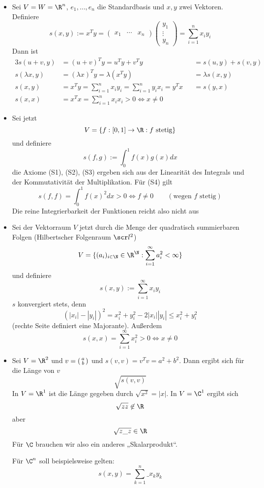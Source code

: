 \documentclass[a4paper, 10pt]{scrbook}
\begin{document}
\begin{ex}
	\begin{itemize}
		\item
			Sei $V=W=\R^n$, $e_1,\dotsc,e_n$ die Standardbasis und $x,y$ zwei Vektoren.
			Definiere
			\[
			s(x,y) := x^Ty = \begin{pmatrix}x_1&\cdots &x_n\end{pmatrix} \begin{pmatrix}y_1\\\vdots\\y_n\end{pmatrix}=\sum_{i=1}^n x_iy_i
			\]
			Dann ist
			\begin{alignat*}{3}
				s(u+v,y) &= (u+v)^T y = u^Ty +v^Ty &&= s(u,y) +s(v,y)\\
		  s(\lambda x,y) &= (\lambda x)^Ty = \lambda(x^T y) &&= \lambda s(x,y)\\
						s(x,y) &= x^Ty =\sum_{i=1}^nx_iy_i = \sum_{i=1}^ny_ix_i = y^Tx &&= s(y,x)\\
				s(x,x) &= x^Tx = \sum_{i=1}^nx_ix_i > 0 \iff x\neq 0
			\end{alignat*}
		\item
			Sei jetzt
			\[
				V=\{f:[0,1]\to \R: f \text{ stetig}\}
			\]
			und definiere
			\[
				s(f,g) := \int_0^1 f(x)g(x) dx
			\]
			die Axiome (S1), (S2), (S3) ergeben sich aus der Linearität des Integrals und der Kommutativität der Multiplikation.
			Für (S4) gilt
			\[
				s(f,f) = \int_0^1f(x)^2 dx > 0 \iff f\neq 0 \qquad (\text{wegen $f$ stetig})
			\]
			Die reine Integrierbarkeit der Funktionen reicht also nicht aus
		\item
			Sei der Vektorraum $V$ jetzt durch die Menge der quadratisch summierbaren Folgen (Hilbertscher Folgenraum $\scr l^2$)
			\[
				V=\{(a_i)_{i\in \N}\in \R^\N : \sum_{i=1}^\infty a_i^2 <\infty\}
			\]
			und definiere
			\[
				s(x,y) := \sum_{i=1}^\infty x_iy_i
			\]
			$s$ konvergiert stets, denn
			\[
				(|x_i| - |y_i|)^2 = x_i^2 +y_i^2 - 2|x_i||y_i| \le x_i^2 +y_i^2
			\]
			(rechte Seite definiert eine Majorante).
			Außerdem
			\[
				s(x,x) = \sum_{i=1}^\infty x_i^2 > 0 \iff x\neq 0
			\]
		\item
			Sei $V=\R^2$ und $v=\begin{psmallmatrix}a\\b\end{psmallmatrix}$ und $s(v,v) = v^Tv = a^2 +b^2$.
			Dann ergibt sich für die Länge von $v$
			\[
				\sqrt{s(v,v)}
			\]
			In $V=\R^1$ ist die Länge gegeben durch $\sqrt{x^2} =|x|$.
			In $V=\C^1$ ergibt sich
			\[
				\sqrt{zz} \not\in \R
			\]
			aber
			\[
				\sqrt{z\_z} \in \R
			\]
			Für $\C$ brauchen wir also ein anderes „Skalarprodukt“.

			Für $\C^n$ soll beispielsweise gelten: 
			\[
				s(x,y) = \sum_{k=1}^n \_x_k y_k
			\]			
	\end{itemize}
\end{ex}
\end{document}
